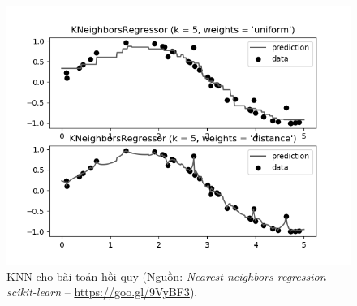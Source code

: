 \begin{figure}[t]
\centering
\includegraphics[width =
.7\textwidth]{Chapters/03_SimpleML/6_knn/sphx_glr_plot_regression_001_gray.png}
\caption[]{KNN cho bài toán hồi quy (Nguồn:
\textit{Nearest neighbors regression -- scikit-learn} -- \url{https://goo.gl/9VyBF3}).}
\label{fig:6_knn_reg}
\end{figure}











